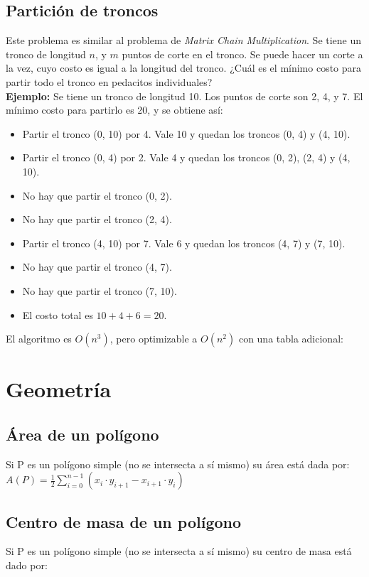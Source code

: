 \documentclass[10pt,letterpaper,twocolumn,twosided]{article}
\newcommand{\codigofuente}[1]{

\dotfill
}
\begin{document}
\subsection{Partición de troncos}
Este problema es similar al problema de \textit{Matrix Chain Multiplication}. Se tiene
un tronco de longitud $n$, y $m$ puntos de corte en el tronco. Se puede hacer un corte a la vez,
cuyo costo es igual a la longitud del tronco. ¿Cuál es el mínimo costo para partir todo el tronco
en pedacitos individuales?
\\
\medskip
\textbf{Ejemplo:} Se tiene un tronco de longitud 10. Los puntos de corte son 2, 4, y 7. El mínimo
costo para partirlo es 20, y se obtiene así:
\begin{itemize}
\item Partir el tronco (0, 10) por 4. Vale 10 y quedan los troncos (0, 4) y (4, 10).
\item Partir el tronco (0, 4) por 2. Vale 4 y quedan los troncos (0, 2), (2, 4) y (4, 10).
\item No hay que partir el tronco (0, 2).
\item No hay que partir el tronco (2, 4).
\item Partir el tronco (4, 10) por 7. Vale 6 y quedan los troncos (4, 7) y (7, 10).
\item No hay que partir el tronco (4, 7).
\item No hay que partir el tronco (7, 10).
\item El costo total es $10+4+6 = 20$.
\end{itemize}

\medskip
El algoritmo es $O(n^3)$, pero optimizable a $O(n^2)$ con una tabla adicional:
\codigofuente{./src/dp/particion_troncos.cpp}

\section{Geometría}
\subsection{Área de un polígono}
Si P es un polígono simple (no se intersecta a sí mismo) su área está dada por: \\

$ A(P) = \frac{1}{2} \displaystyle\sum_{i=0}^{n-1} (x_{i} \cdot y_{i+1} - x_{i+1} \cdot y_{i}) $ \\
\bigskip
\codigofuente{./src/geometria/polygon_area.cpp}

\subsection{Centro de masa de un polígono}
Si P es un polígono simple (no se intersecta a sí mismo) su centro de masa está dado por: \\
\end{document}
